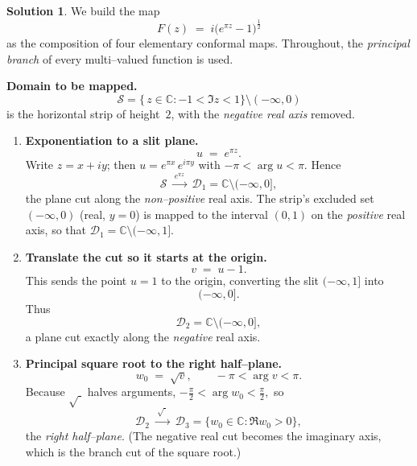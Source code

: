 \documentclass[12pt]{article}
\theoremstyle{definition} %
\newtheorem{solution}{Solution}
\theoremstyle{plain} %
\begin{document}
   \begin{solution}
      We build the map  
      \[
      F(z)\;=\;i\bigl(e^{\pi z}-1\bigr)^{\tfrac12}
      \]
      as the composition of four elementary conformal maps.  Throughout,
      the \emph{principal branch} of every multi–valued function is used.
      
      \medskip
      \textbf{Domain to be mapped.}
      \[
      \boxed{
         \mathcal S
         =\bigl\{\,z\in\mathbb{C} : -1<\Im z<1\bigr\}
          \setminus (-\infty,0)
       }
      \]
      is the horizontal strip of height~$2$, with the \emph{negative real
      axis} removed.
      
      \medskip
      \begin{enumerate}[label=\textbf{Step \arabic*:}, itemsep=1.4ex]
      
      \item  \textbf{Exponentiation to a slit plane.}  
      \[
      u \;=\; e^{\pi z}.
      \]
      Write $z=x+iy$; then  
      $u=e^{\pi x}\,e^{i\pi y}$ with
      \(
      -\pi<\arg u<\pi.
      \)
      Hence
      \[
      \mathcal S
      \;\xrightarrow{\,e^{\pi z}\,}\;
      \mathcal D_1
        = \mathbb{C}\setminus(-\infty,0],
      \]
      the plane cut along the \emph{non–positive} real axis.  
      The strip’s excluded set $(-\infty,0)$ (real, $y=0$) is mapped to the
      interval $(0,1)$ on the \emph{positive} real axis, so that
      \(
      \mathcal D_1
      =\mathbb{C}\setminus(-\infty,1].
      \)
      
      \item \textbf{Translate the cut so it starts at the origin.}  
      \[
      v \;=\; u-1.
      \]
      This sends the point $u=1$ to the origin, converting the slit
      $(-\infty,1]$ into
      \[
      (-\infty,0].
      \]
      Thus
      \[
      \mathcal D_2
        = \mathbb{C}\setminus(-\infty,0],
      \]
      a plane cut exactly along the \emph{negative} real axis.
      
      \item \textbf{Principal square root to the right half–plane.}  
      \[
      w_0 \;=\; \sqrt{v},
      \qquad
      -\pi<\arg v<\pi.
      \]
      Because $\sqrt{\;}$ halves arguments,
      \(
      -\tfrac{\pi}{2}<\arg w_0<\tfrac{\pi}{2},
      \)
      so
      \[
      \mathcal D_2
      \;\xrightarrow{\,\sqrt{\;}\,}\;
      \mathcal D_3
        = \{w_0\in\mathbb{C} : \Re w_0>0\},
      \]
      the \emph{right half–plane}.  
      (The negative real cut becomes the imaginary axis,
      which is the branch cut of the square root.)
      

\end{enumerate}
\end{solution}
\end{document}
